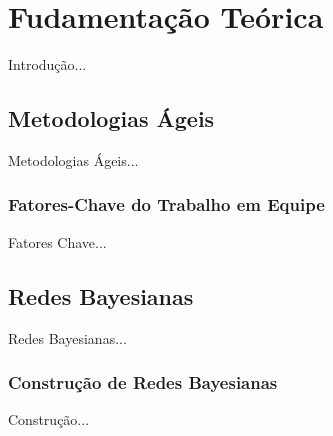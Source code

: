 \chapter{Fudamentação Teórica}
\label{fundamentacao}

{\color{red} Introdução...}

\section{Metodologias Ágeis}
\label{fundamentacao:ageis}

{\color{red} Metodologias Ágeis...}

\subsection{Fatores-Chave do Trabalho em Equipe}
\label{fundamentacao:ageis:fatores}

{\color{red} Fatores Chave...}

\section{Redes Bayesianas}
\label{fundamentacao:redes}

{\color{red} Redes Bayesianas...}

\subsection{Construção de Redes Bayesianas}
\label{fundamentacao:redes:construcao}
{\color{red} Construção...}
